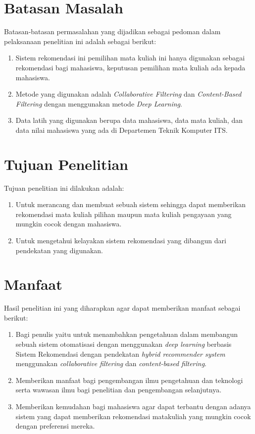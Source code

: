 \section{Batasan Masalah}
Batasan-batasan permasalahan yang dijadikan sebagai pedoman dalam pelaksanaan penelitian ini adalah sebagai berikut:
\begin{enumerate}[noitemsep]
      \item Sistem rekomendasi ini pemilihan mata kuliah ini hanya digunakan sebagai rekomendasi bagi mahasiswa, keputusan pemilihan mata kuliah ada kepada mahasiswa.
      \item Metode yang digunakan adalah \emph{Collaborative Filtering} dan \emph{Content-Based Filtering} dengan menggunakan metode \emph{Deep Learning}.
      \item Data latih yang digunakan berupa data mahasiswa, data mata kuliah, dan data nilai mahasiswa yang ada di Departemen Teknik Komputer ITS.
\end{enumerate}

\section{Tujuan Penelitian}
Tujuan penelitian ini dilakukan adalah:
\begin{enumerate}[noitemsep]
      \item Untuk merancang dan membuat sebuah sistem sehingga dapat memberikan rekomendasi mata kuliah pilihan
            maupun mata kuliah pengayaan yang mungkin cocok dengan mahasiswa.
      \item Untuk mengetahui kelayakan sistem rekomendasi yang dibangun dari pendekatan yang digunakan.
\end{enumerate}

\section{Manfaat}
Hasil penelitian ini yang diharapkan agar dapat memberikan manfaat sebagai berikut:
\begin{enumerate}[noitemsep]
      \item Bagi penulis yaitu untuk menambahkan pengetahuan dalam membangun sebuah sistem
            otomatisasi dengan menggunakan \emph{deep learning} berbasis Sistem Rekomendasi
            dengan pendekatan \emph{hybrid recommender system} menggunakan \emph{collaborative filtering} dan \emph{content-based filtering}.
      \item Memberikan manfaat bagi pengembangan ilmu pengetahuan dan teknologi serta wawasan ilmu bagi
            penelitian dan pengembangan selanjutnya.
      \item Memberikan kemudahan bagi mahasiswa agar dapat terbantu dengan adanya sistem yang dapat memberikan rekomendasi matakuliah yang mungkin cocok dengan preferensi mereka.
\end{enumerate}